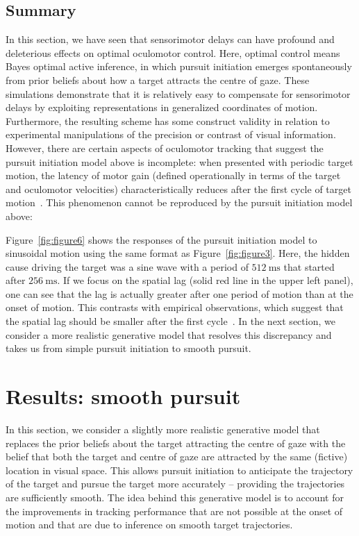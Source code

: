 \documentclass[a4paper]{article} %
\newcommand{\ms}{\si{\milli\second}}%
\begin{document}
\subsection{Summary}

In this section, we have seen that sensorimotor delays can have profound
and deleterious effects on optimal oculomotor control. Here, optimal
control means Bayes optimal active inference, in which pursuit
initiation emerges spontaneously from prior beliefs about how a target
attracts the centre of gaze. These simulations demonstrate that it is
relatively easy to compensate for sensorimotor delays by exploiting
representations in generalized coordinates of motion. Furthermore, the
resulting scheme has some construct validity in relation to experimental
manipulations of the precision or contrast of visual information.
However, there are certain aspects of oculomotor tracking that suggest
the pursuit initiation model above is incomplete: when presented with
periodic target motion, the latency of motor gain (defined operationally
in terms of the target and oculomotor velocities) characteristically
reduces after the first cycle of target motion~\citep{Barnes00}.
This phenomenon cannot be reproduced by the pursuit initiation model
above:

Figure~\ref{fig:figure6} shows the responses of the pursuit initiation model to
sinusoidal motion using the same format as Figure~\ref{fig:figure3}. Here, the hidden
cause driving the target was a sine wave with a period of $512~\ms$ that started after $256~\ms$. If we focus on the
spatial lag (solid red line in the upper left panel), one can see that
the lag is actually greater after one period of motion than at the onset
of motion. This contrasts with empirical observations, which suggest
that the spatial lag should be smaller after the first cycle~\citep{Barnes00}. In the next section, we consider a more realistic generative
model that resolves this discrepancy and takes us from simple pursuit
initiation to smooth pursuit.

\section{Results: smooth pursuit}
\label{sec:spem}
In this section, we consider a slightly more realistic generative model
that replaces the prior beliefs about the target attracting the centre
of gaze with the belief that both the target and centre of gaze are
attracted by the same (fictive) location in visual space. This allows
pursuit initiation to anticipate the trajectory of the target and pursue
the target more accurately -- providing the trajectories are
sufficiently smooth. The idea behind this generative model is to account
for the improvements in tracking performance that are not possible at
the onset of motion and that are due to inference on smooth target
trajectories.
\end{document}
